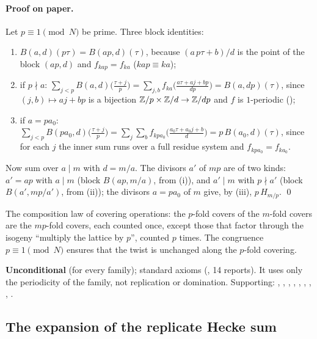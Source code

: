 \paragraph{Proof on paper.}  Let $p\equiv1\pmod N$ be prime.  Three block identities:
\begin{enumerate}[label=(\roman*)]
\item $B(a,d)(p\tau)=B(ap,d)(\tau)$, because $(a\,p\tau+b)/d$ is the point of the block $(ap,d)$ and $f_{kap}=f_{ka}$ ($kap\equiv ka$);
\item if $p\nmid a$: $\sum_{j<p}B(a,d)\bigl(\frac{\tau+j}p\bigr)=\sum_{j,b}f_{ka}\bigl(\frac{a\tau+aj+bp}{dp}\bigr)=B(a,dp)(\tau)$, since
  $(j,b)\mapsto aj+bp$ is a bijection ${\mathbb{Z}}/p\times{\mathbb{Z}}/d\to{\mathbb{Z}}/dp$ and $f$ is $1$-periodic ();
\item if $a=pa_0$: $\sum_{j<p}B(pa_0,d)\bigl(\frac{\tau+j}p\bigr)=\sum_j\sum_bf_{kpa_0}\bigl(\frac{a_0\tau+a_0j+b}d\bigr)=p\,B(a_0,d)(\tau)$, since for each
  $j$ the inner sum runs over a full residue system and $f_{kpa_0}=f_{ka_0}$.
\end{enumerate}
Now sum over $a\mid m$ with $d=m/a$.  The divisors $a'$ of $mp$ are of two kinds: $a'=ap$ with $a\mid m$ (block
$B(ap,m/a)$, from (i)), and $a'\mid m$ with $p\nmid a'$ (block $B(a',mp/a')$, from (ii)); the divisors $a=pa_0$ of $m$ give, by
(iii), $p\,H_{m/p}$. \qed
\begin{physics}The composition law of covering operations: the $p$-fold covers of the $m$-fold covers are the $mp$-fold
covers, each counted once, except those that factor through the isogeny ``multiply the lattice by $p$'', counted $p$ times.
The congruence $p\equiv1\pmod N$ ensures that the twist is unchanged along the $p$-fold covering.\end{physics}
\begin{status}\textbf{Unconditional} (for every family); standard axioms (, 14
reports).  It uses only the periodicity of the family, not replication or domination.  Supporting: ,
, , ,
, , ,
, .\end{status}

\subsection{The expansion of the replicate Hecke sum}

